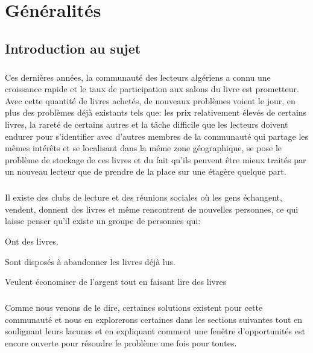 

\chapter{Généralités}
\section{Introduction au sujet}

\paragraph*{}
Ces dernières années, la communauté des lecteurs algériens a connu une croissance rapide et le taux de participation aux salons du livre est prometteur. Avec cette quantité de livres achetés, de nouveaux problèmes voient le jour, en plus des problèmes déjà existants tels que: les prix relativement élevés de certains livres, la rareté de certains autres et la tâche difficile que les lecteurs doivent endurer pour s'identifier avec d'autres membres de la communauté qui partage les mêmes intérêts et se localisant dans la même zone géographique, se pose le problème de stockage de ces livres et du fait qu’ils peuvent être mieux traités par un nouveau lecteur que de prendre de la place sur une étagère quelque part.


\paragraph*{}
Il existe des clubs de lecture et des réunions sociales où les gens échangent, vendent, donnent des livres et même rencontrent de nouvelles personnes, ce qui laisse penser qu'il existe un groupe de personnes qui:

\begin{list}{•}{}
	\item Ont des livres.
	\item Sont disposés à abandonner les livres déjà lus.
	\item Veulent économiser de l’argent tout en faisant lire des livres
\end{list}

\paragraph*{}
Comme nous venons de le dire, certaines solutions existent pour cette communauté et nous en explorerons certaines dans les sections suivantes tout en soulignant leurs lacunes et en expliquant comment une fenêtre d'opportunités est encore ouverte pour résoudre le problème une fois pour toutes.

